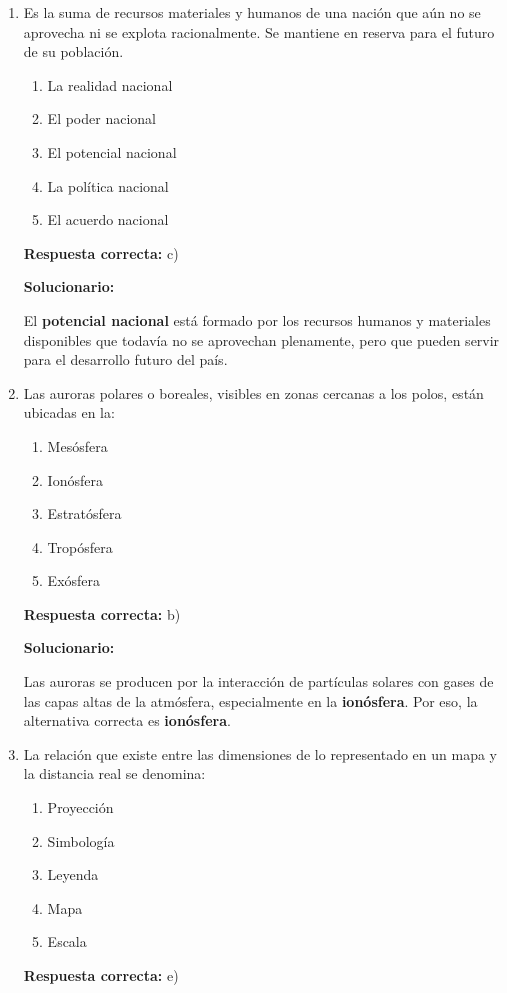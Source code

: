 \begin{enumerate}[resume]
	
	\item Es la suma de recursos materiales y humanos de una nación que aún no se aprovecha ni se explota racionalmente. Se mantiene en reserva para el futuro de su población.
	\begin{enumerate}[label=\alph*)]
		\item La realidad nacional
		\item El poder nacional
		\item El potencial nacional
		\item La política nacional
		\item El acuerdo nacional
	\end{enumerate}
	\textbf{Respuesta correcta:} c)
	
	\vspace{2mm}
	\textbf{Solucionario:}
	
	El \textbf{potencial nacional} está formado por los recursos humanos y materiales disponibles que todavía no se aprovechan plenamente, pero que pueden servir para el desarrollo futuro del país.
	
	\vspace{6mm}
	
	\item Las auroras polares o boreales, visibles en zonas cercanas a los polos, están ubicadas en la:
	\begin{enumerate}[label=\alph*)]
		\item Mesósfera
		\item Ionósfera
		\item Estratósfera
		\item Tropósfera
		\item Exósfera
	\end{enumerate}
	\textbf{Respuesta correcta:} b)
	
	\vspace{2mm}
	\textbf{Solucionario:}
	
	Las auroras se producen por la interacción de partículas solares con gases de las capas altas de la atmósfera, especialmente en la \textbf{ionósfera}. Por eso, la alternativa correcta es \textbf{ionósfera}.
	
	\vspace{6mm}
	
	\item La relación que existe entre las dimensiones de lo representado en un mapa y la distancia real se denomina:
	\begin{enumerate}[label=\alph*)]
		\item Proyección
		\item Simbología
		\item Leyenda
		\item Mapa
		\item Escala
	\end{enumerate}
	\textbf{Respuesta correcta:} e)
	

\end{enumerate}
